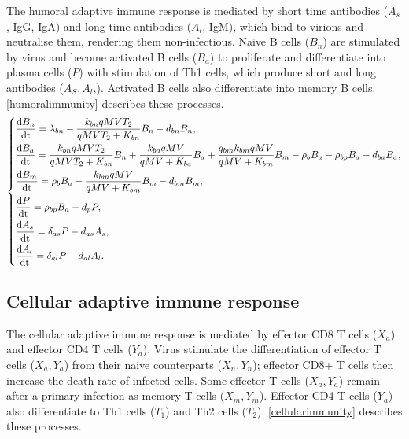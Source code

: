 \documentclass[preprint,11pt,sort&compress,square]{elsarticle}
\numberwithin{equation}{section}
\begin{document}
The humoral adaptive immune response is mediated by short time antibodies ($A_{s}$, IgG, IgA) and long time antibodies ($A_{l}$, IgM), which bind to virions and neutralise them, rendering them non-infectious. Naive B cells ($B_{n}$) are stimulated by virus and become activated B cells ($B_{a}$) to proliferate and differentiate into plasma cells ($P$) with stimulation of Th1 cells, which produce short and long antibodies ($A_{S}, A_{l}$,).  Activated B cells also differentiate into memory B cells. \eqref{humoralimmunity} describes these processes.
\begin{equation}\label{humoralimmunity}
	\left\{
	\begin{aligned}
		 & \frac{{\rm d } B_{n}}{{\rm dt}}=\lambda_{bn}-\frac{k_{bn}qMVT_{2}}{qMVT_{2}+K_{bn}}B_{n}-d_{bn}B_{n},\\
		 & \frac{{\rm d } B_{a}}{{\rm dt}}=\frac{k_{bn}qMVT_{2}}{qMVT_{2}+K_{bn}}B_{n}+\frac{k_{ba}qMV}{qMV+K_{ba}}B_{a}+\frac{q_{bm}k_{bm}qMV}{qMV+K_{bm}}B_{m}-\rho_{b}B_{a}-\rho_{bp}B_{a}-d_{ba}B_{a}, \\
		 & \frac{{\rm d } B_{m}}{{\rm dt}}=\rho_{b} B_{a}-\frac{k_{bm}qMV}{qMV+K_{bm}}B_{m}-d_{bm}B_{m},                                                                                                                       \\
		 & \frac{{\rm d } P}{{\rm dt}}=\rho_{bp}B_{a}-d_{p}P,\\
		 & \frac{{\rm d } A_{s}}{{\rm dt}}=\delta_{as}P-d_{as}A_{s},                                                                                                                                                         \\
		 & \frac{{\rm d } A_{l}}{{\rm dt}}=\delta_{al}P-d_{al}A_{l}.                                                                                                                                                         \\
	\end{aligned}
	\right.
\end{equation}


\subsection{Cellular adaptive immune response}
The cellular adaptive immune response is mediated by effector CD8 T cells ($X_{a}$) and effector CD4 T cells ($Y_{a}$). Virus stimulate the differentiation of effector  T cells ($X_{a}, Y_{a}$) from their naive counterparts ($X_{n}, Y_{n}$); effector CD8+ T cells then increase the death rate of infected cells. Some effector  T cells ($X_{a}, Y_{a}$) remain after a primary infection as memory  T cells ($X_{m},Y_{m}$). Effector CD4 T cells ($Y_{a}$) also differentiate to Th1 cells ($T_{1}$) and Th2 cells ($T_{2}$).
\eqref{cellularimmunity} describes these processes.
\end{document}
